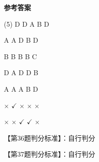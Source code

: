 \documentclass[11pt, a4paper]{article}
\begin{document}
\begin{center}
    \Huge \textbf{参考答案}
\end{center}

    \begin{tasks}[label=\arabic*. , label-width=14pt](5)
        \task D
        \task D
        \task A
        \task B
        \task D

        \task A
        \task A
        \task D
        \task B
        \task D

        \task B
        \task B
        \task B
        \task B
        \task C

        \task D
        \task A
        \task D
        \task D
        \task B

        \task A
        \task A
        \task A
        \task B
        \task D

        \task $\times$
        \task $\checkmark$
        \task $\times$
        \task $\times$
        \task $\times$

        \task $\times$
        \task $\times$
        \task $\checkmark$
        \task $\checkmark$
        \task $\times$
    \end{tasks}

    【第36题判分标准】：自行判分

    【第37题判分标准】：自行判分
\end{document}

